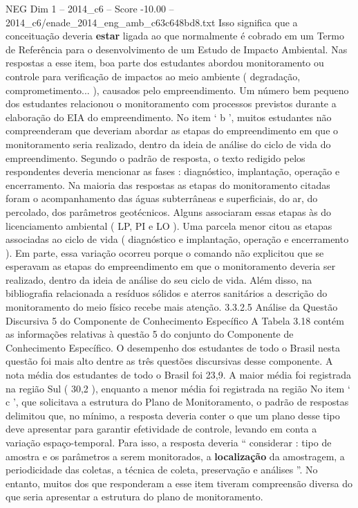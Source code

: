 \begin{textsample}{NEG Dim 1 – 2014\_c6 – Score -10.00 – 2014\_c6/enade\_2014\_eng\_amb\_c63c648bd8.txt}
Isso significa que a conceituação deveria \textbf{estar} ligada ao que normalmente é cobrado em um Termo de Referência para o desenvolvimento de um Estudo de Impacto Ambiental.
Nas respostas a esse item, boa parte dos estudantes abordou monitoramento ou controle para verificação de impactos ao meio ambiente ( degradação, comprometimento... ), causados pelo empreendimento.
Um número bem pequeno dos estudantes relacionou o monitoramento com processos previstos durante a elaboração do EIA do empreendimento.
No item ‘ b ’, muitos estudantes não compreenderam que deveriam abordar as etapas do empreendimento em que o monitoramento seria realizado, dentro da ideia de análise do ciclo de vida do empreendimento.
Segundo o padrão de resposta, o texto redigido pelos respondentes deveria mencionar as fases : diagnóstico, implantação, operação e encerramento.
Na maioria das respostas as etapas do monitoramento citadas foram o acompanhamento das águas subterrâneas e superficiais, do ar, do percolado, dos parâmetros geotécnicos.
Alguns associaram essas etapas às do licenciamento ambiental ( LP, PI e LO ).
Uma parcela menor citou as etapas associadas ao ciclo de vida ( diagnóstico e implantação, operação e encerramento ).
Em parte, essa variação ocorreu porque o comando não explicitou que se esperavam as etapas do empreendimento em que o monitoramento deveria ser realizado, dentro da ideia de análise do seu ciclo de vida.
Além disso, na bibliografia relacionada a resíduos sólidos e aterros sanitários a descrição do monitoramento do meio físico recebe mais atenção. 3.3.2.5 Análise da Questão Discursiva 5 do Componente de Conhecimento Específico A Tabela 3.18 contém as informações relativas à questão 5 do conjunto do Componente de Conhecimento Específico.
O desempenho dos estudantes de todo o Brasil nesta questão foi mais alto dentre as três questões discursivas desse componente.
A nota média dos estudantes de todo o Brasil foi 23,9.
A maior média foi registrada na região Sul ( 30,2 ), enquanto a menor média foi registrada na região No item ‘ c ’, que solicitava a estrutura do Plano de Monitoramento, o padrão de respostas delimitou que, no mínimo, a resposta deveria conter o que um plano desse tipo deve apresentar para garantir efetividade de controle, levando em conta a variação espaço-temporal.
Para isso, a resposta deveria “ considerar : tipo de amostra e os parâmetros a serem monitorados, a \textbf{localização} da amostragem, a periodicidade das coletas, a técnica de coleta, preservação e análises ”.
No entanto, muitos dos que responderam a esse item tiveram compreensão diversa do que seria apresentar a estrutura do plano de monitoramento.

\end{textsample}
